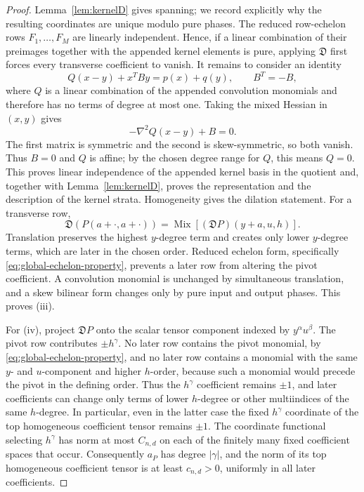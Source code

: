 \documentclass[11pt]{article}
\numberwithin{equation}{section}
\theoremstyle{remark}
\theoremstyle{definition}
\newcommand{\Mix}{\operatorname{Mix}}
\newcommand{\Dop}{\mathfrak D}
\begin{document}
\begin{proof}
Lemma~\ref{lem:kernelD} gives spanning; we record explicitly why the
resulting coordinates are unique modulo pure phases.  The reduced
row-echelon rows $F_1,\ldots,F_M$ are linearly independent.  Hence, if a
linear combination of their preimages together with the appended kernel
elements is pure, applying $\Dop$ first forces every transverse coefficient
to vanish.  It remains to consider an identity
\[
 Q(x-y)+x^TBy=p(x)+q(y),\qquad B^T=-B,
\]
where $Q$ is a linear combination of the appended convolution monomials and
therefore has no terms of degree at most one.  Taking the mixed Hessian in
$(x,y)$ gives
\[
 -\nabla^2Q(x-y)+B=0.
\]
The first matrix is symmetric and the second is skew-symmetric, so both
vanish.  Thus $B=0$ and $Q$ is affine; by the chosen degree range for $Q$,
this means $Q=0$.  This proves linear independence of the appended kernel
basis in the quotient and, together with Lemma~\ref{lem:kernelD}, proves the
representation and the description of the kernel strata.  Homogeneity gives
the dilation statement.  For a transverse row,
\[
 \Dop(P(a+\cdot,a+\cdot))=
 \Mix[(\Dop P)(y+a,u,h)].
\]
Translation preserves the highest $y$-degree term and creates only lower
$y$-degree terms, which are later in the chosen order.  Reduced echelon
form, specifically \eqref{eq:global-echelon-property}, prevents a later
row from altering the pivot coefficient.  A
convolution monomial is unchanged by simultaneous translation, and a skew
bilinear form changes only by pure input and output phases.  This proves
(iii).

For (iv), project $\Dop P$ onto the scalar tensor component indexed by
$y^\alpha u^\beta$.  The pivot row contributes $\pm h^\gamma$.  No later
row contains the pivot monomial, by
\eqref{eq:global-echelon-property}, and no later
row contains a monomial with the same $y$- and $u$-component and higher
$h$-order, because such a monomial would precede the pivot in the defining
order.  Thus the $h^\gamma$ coefficient remains $\pm1$, and later
coefficients can change only terms of lower $h$-degree or other
multiindices of the same $h$-degree.  In particular, even in the latter
case the fixed $h^\gamma$ coordinate of the top homogeneous coefficient
tensor remains $\pm1$.  The coordinate
functional selecting $h^\gamma$ has norm at most $C_{n,d}$ on each of the
finitely many fixed coefficient spaces that occur.  Consequently $a_P$
has degree $|\gamma|$, and the norm of its top homogeneous coefficient
tensor is at least $c_{n,d}>0$, uniformly in all later coefficients.
\end{proof}
\end{document}
